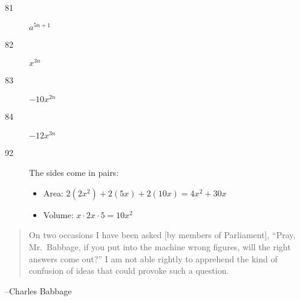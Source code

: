 \documentclass[letterpaper, landscape]{exam}
\begin{document}
\begin{description}
          \item[81] $a^{5n+1}$

          \item[82] $x^{3n}$

          \item[83] $-10x^{2n}$

          \item[84] $-12x^{3n}$ 

          \item[92]
              The sides come in pairs: 

              \begin{itemize}
                \item Area: $2(2x^2) + 2(5x) + 2(10x) = \boxed{ 4x^2 + 30x }$
                \item Volume: $x \cdot 2x \cdot 5 = \boxed{ 10x^2 }$
              \end{itemize}

      \end{description}

  \fi
  \ifprintanswers{}
  \else
    \vspace{3 cm}
    \begin{quote}
      \begin{em}
        On two occasions I have been asked [by members of Parliament], ``Pray, Mr.\ Babbage, if you
        put into the machine wrong figures, will the right answers come out?'' I am not able
        rightly to apprehend the kind of confusion of ideas that could provoke such a question.
      \end{em}
    \end{quote}
    \hspace{2 cm}--Charles Babbage
  \fi
\end{document}
